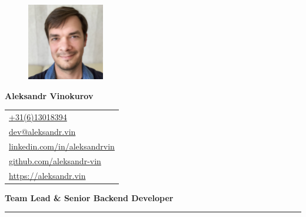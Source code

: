 \documentclass[letterpaper, 11pt]{article}
\begin{document}
\begin{figure} %
  \vspace{-5ex} %
  \includegraphics[width=0.3\textwidth]{me.jpg} %
\end{figure}

\noindent\textbf{\Huge Aleksandr Vinokurov}

\vspace{1em}

\noindent
\begin{tabular}{@{\hspace{5mm}}l}
\href{tel:+31613018394}{\url{+31(6)13018394}} \\
\href{mailto:dev@aleksandr.vin}{\url{dev@aleksandr.vin}} \\
\href{https://linkedin.com/in/aleksandrvin}{\url{linkedin.com/in/aleksandrvin}} \\
\href{https://github.com/aleksandr-vin}{\url{github.com/aleksandr-vin}} \\
\href{https://aleksandr.vin}{\url{https://aleksandr.vin}}
\end{tabular}

\vspace{1em}

\noindent\parbox{\linewidth}{\raggedright\textbf{\Large Team Lead \& Senior Backend Developer}} %

\vspace{1em}















\vspace{5em}
\hrule
\vspace{1em}
\end{document}
